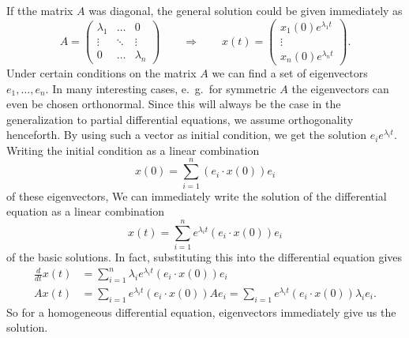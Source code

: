If tthe matrix $A$ was diagonal, the general solution could be given
immediately as
\[
A=\begin{pmatrix}
\lambda_1&\dots&0\\
\vdots&\ddots&\vdots\\
0&\dots&\lambda_n
\end{pmatrix}
\qquad\Rightarrow\qquad
x(t)=\begin{pmatrix}
x_1(0)e^{\lambda_1t}
\\
\vdots
\\
x_n(0)e^{\lambda_nt}
\end{pmatrix}.
\]
Under certain conditions on the matrix $A$ we can find a set of
eigenvectors $e_1,\dots,e_n$.
In many interesting cases, e.~g.~for symmetric $A$ the eigenvectors
can even be chosen orthonormal.
Since this will always be the case in the generalization to partial
differential equations, we assume orthogonality henceforth.
By using such a vector as initial condition, we get the solution
$e_ie^{\lambda_it}$.
Writing the initial condition as a linear combination
\[
x(0)=\sum_{i=1}^n(e_i \cdot x(0))e_i
\]
of these eigenvectors,
We can immediately write the solution of the differential equation
as a linear combination
\begin{equation}
x(t)=\sum_{i=1}^n
e^{\lambda_i t}
(e_i\cdot x(0))e_i
\label{development}
\end{equation}
of the basic solutions.
In fact, substituting this into the differential equation gives
\begin{align*}
\frac{d}{dt}x(t)&=\sum_{i=1}^n\lambda_ie^{\lambda_i t}(e_i\cdot x(0))e_i
\\
Ax(t)
&=\sum_{i=1}e^{\lambda_it}(e_i\cdot x(0))Ae_i
=\sum_{i=1}e^{\lambda_it}(e_i\cdot x(0))\lambda_i e_i.
\end{align*}
So for a homogeneous differential equation, eigenvectors immediately
give us the solution.

